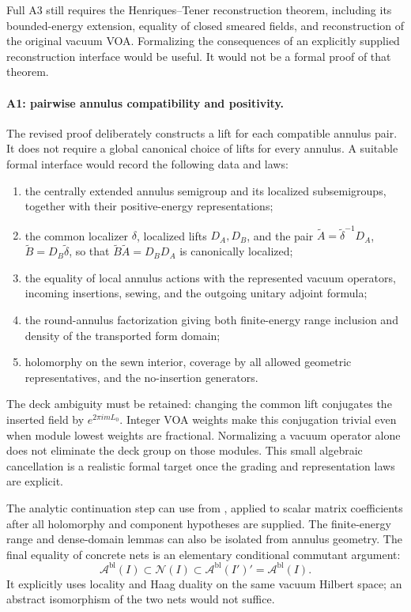 Full A3 still requires the Henriques--Tener reconstruction theorem,
including its bounded-energy extension, equality of closed smeared
fields, and reconstruction of the original vacuum VOA. Formalizing
the consequences of an explicitly supplied reconstruction interface
would be useful. It would not be a formal proof of that theorem.

\paragraph{A1: pairwise annulus compatibility and positivity.}
The revised proof deliberately constructs a lift for each compatible
annulus pair. It does not require a global canonical choice of lifts
for every annulus. A suitable formal interface would record the
following data and laws:
\begin{enumerate}
\item the centrally extended annulus semigroup and its localized
subsemigroups, together with their positive-energy representations;
\item the common localizer $\delta$, localized lifts $D_A,D_B$, and
the pair $\widetilde A=\widetilde\delta^{-1}D_A$,
$\widetilde B=D_B\widetilde\delta$, so that
$\widetilde B\widetilde A=D_BD_A$ is canonically localized;
\item the equality of local annulus actions with the represented
vacuum operators, incoming insertions, sewing, and the outgoing
unitary adjoint formula;
\item the round-annulus factorization giving both finite-energy
range inclusion and density of the transported form domain;
\item holomorphy on the sewn interior, coverage by all allowed
geometric representatives, and the no-insertion generators.
\end{enumerate}
The deck ambiguity must be retained: changing the common lift conjugates
the inserted field by $e^{2\pi i mL_0}$. Integer VOA weights make this
conjugation trivial even when module lowest weights are fractional.
Normalizing a vacuum operator alone does not eliminate the deck group
on those modules. This small algebraic cancellation is a realistic
formal target once the grading and representation laws are explicit.

The analytic continuation step can use
 from
, applied to scalar
matrix coefficients after all holomorphy and component hypotheses are
supplied. The finite-energy range and dense-domain lemmas can also be
isolated from annulus geometry. The final equality of concrete nets is
an elementary conditional commutant argument:
\[
 \mathcal A^{\mathrm{bl}}(I)\subset\mathcal N(I)
 \subset\mathcal A^{\mathrm{bl}}(I')'
 =\mathcal A^{\mathrm{bl}}(I).
\]
It explicitly uses locality and Haag duality on the same vacuum Hilbert
space; an abstract isomorphism of the two nets would not suffice.

